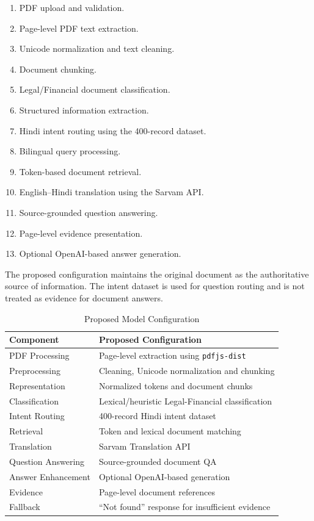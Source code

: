 \begin{enumerate}
    \item PDF upload and validation.
    \item Page-level PDF text extraction.
    \item Unicode normalization and text cleaning.
    \item Document chunking.
    \item Legal/Financial document classification.
    \item Structured information extraction.
    \item Hindi intent routing using the 400-record dataset.
    \item Bilingual query processing.
    \item Token-based document retrieval.
    \item English--Hindi translation using the Sarvam API.
    \item Source-grounded question answering.
    \item Page-level evidence presentation.
    \item Optional OpenAI-based answer generation.
\end{enumerate}

The proposed configuration maintains the original document as the
authoritative source of information. The intent dataset is used for
question routing and is not treated as evidence for document answers.

\begin{table}[H]
\centering
\caption{Proposed Model Configuration}
\begin{tabular}{|p{5cm}|p{8cm}|}
\hline
\textbf{Component} & \textbf{Proposed Configuration} \\
\hline
PDF Processing & Page-level extraction using \texttt{pdfjs-dist} \\
\hline
Preprocessing & Cleaning, Unicode normalization and chunking \\
\hline
Representation & Normalized tokens and document chunks \\
\hline
Classification & Lexical/heuristic Legal-Financial classification \\
\hline
Intent Routing & 400-record Hindi intent dataset \\
\hline
Retrieval & Token and lexical document matching \\
\hline
Translation & Sarvam Translation API \\
\hline
Question Answering & Source-grounded document QA \\
\hline
Answer Enhancement & Optional OpenAI-based generation \\
\hline
Evidence & Page-level document references \\
\hline
Fallback & ``Not found'' response for insufficient evidence \\
\hline
\end{tabular}
\end{table}

